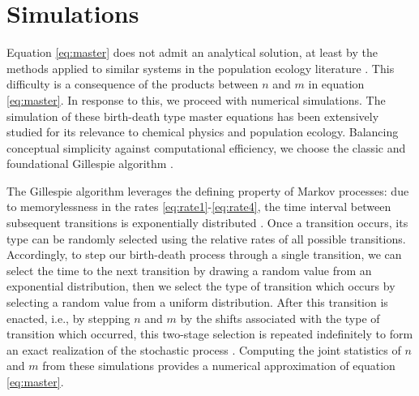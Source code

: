 \documentclass[draft]{agujournal2018}
\begin{document}
\section{Simulations}

Equation \ref{eq:master} does not admit an analytical solution, at least by the methods applied to similar systems in the population ecology literature \citep[e.g][]{Swift2002}.
This difficulty is a consequence of the products between $n$ and $m$ in equation \ref{eq:master}.
In response to this, we proceed with numerical simulations.
The simulation of these birth-death type master equations has been extensively studied for its relevance to chemical physics and population ecology. 
Balancing conceptual simplicity against computational efficiency, we choose the classic and foundational Gillespie algorithm \citep{Gillespie1977, Gillespie1992, Gillespie2007}.

The Gillespie algorithm leverages the defining property of Markov processes: due to memorylessness in the rates \ref{eq:rate1}-\ref{eq:rate4}, the time interval between subsequent transitions is exponentially distributed \citep[e.g.][]{Cox1965}. Once a transition occurs, its type can be randomly selected using the relative rates of all possible transitions.
Accordingly, to step our birth-death process through a single transition, we can select the time to the next transition by drawing a random value from an exponential distribution, then we select the type of transition which occurs by selecting a random value from a uniform distribution. 
After this transition is enacted, i.e., by stepping $n$ and $m$ by the shifts associated with the type of transition which occurred, this two-stage selection is repeated indefinitely to form an exact realization of the stochastic process \citep{Gillespie1977, Gillespie1992, Gillespie2007}.
Computing the joint statistics of $n$ and $m$ from these simulations provides a numerical approximation of equation \ref{eq:master}.
\end{document}
